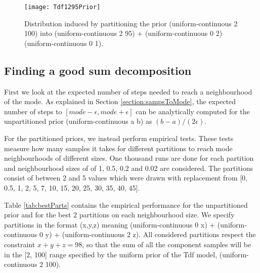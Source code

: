 \begin{figure}[h]
    \centering
    \texttt{[image: Tdf1295Prior]}
    \caption{Distribution induced by partitioning the prior (uniform-continuous 2 100) into (uniform-continuous 2 95) + (uniform-continuous 0 2) (uniform-continuous 0 1).}
    \label{fig:1295Prior}
\end{figure}

\subsection{Finding a good sum decomposition}
\label{sect:goodSum}
First we look at the expected number of steps needed to reach a neighbourhood of the mode. As explained in Section \ref{section:sampsToMode}, the expected number of steps to $[mode - \epsilon, mode + \epsilon]$ can be analytically computed for the unpartitioned prior (uniform-continuous a b) as $(b-a)/(2\epsilon)$.

For the partitioned priors, we instead perform empirical tests. These tests measure how many samples it takes for different partitions to reach mode neighbourhoods of different sizes. One thousand runs are done for each partition and neighbourhood sizes of of 1, 0.5, 0.2 and 0.02 are considered. The partitions consist of between 2 and 5 values which were drawn with replacement from [0, 0.5, 1, 2, 5, 7, 10, 15, 20, 25, 30, 35, 40, 45].

Table \ref{tab:bestParts} contains the empirical performance for the unpartitioned prior and for the best 2 partitions on each neighbourhood size. We specify partitions in the format (x,y,z) meaning (uniform-continuous 0 x) + (uniform-continuous 0 y) + (uniform-continuous 2 z). All considered partitions respect the constraint $x+y+z = 98$, so that the sum of all the component samples will be in the [2, 100] range specified by the uniform prior of the Tdf model, (uniform-continuous 2 100). 


